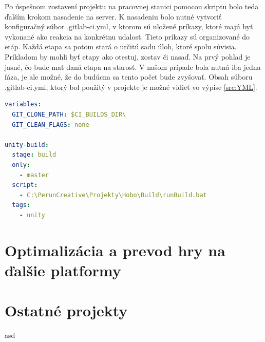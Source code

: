 \documentclass[slovak, bachelorpractice]{diploma}
\begin{document}
Po úspešnom zostavení projektu na pracovnej stanici pomocou skriptu bolo teda ďalším krokom nasadenie na server. K nasadeniu bolo nutné vytvoriť konfiguračný súbor .gitlab-ci.yml, v ktorom sú uložené príkazy, ktoré majú byť vykonané ako reakcia na konkrétnu udalosť. Tieto príkazy sú organizované do etáp. Každá etapa sa potom stará o určitú sadu úloh, ktoré spolu súvisia. Príkladom by mohli byť etapy ako otestuj, zostav či nasaď. Na prvý pohľad je jasné, čo bude mať daná etapa na starosť. V našom prípade bola nutná iba jedna fáza, je ale možné, že do budúcna sa tento počet bude zvyšovať. Obsah súboru .gitlab-ci.yml, ktorý bol použitý v projekte je možné vidieť vo výpise \ref{src:YML}.

\vspace{10pt}
\begin{lstlisting}[language=yml,label=src:YML,caption={Obsah súboru .gitlab-ci.yml}]
variables:
  GIT_CLONE_PATH: $CI_BUILDS_DIR\
  GIT_CLEAN_FLAGS: none

unity-build: 
  stage: build
  only:
    - master
  script:
    - C:\PerunCreative\Projekty\Hobo\Build\runBuild.bat
  tags: 
    - unity
\end{lstlisting}
\section{Optimalizácia a prevod hry na ďalšie platformy}
\label{sec:Port}
\section{Ostatné projekty}
\label{sec:Others}
asd



\printbibliography[title={Literatúra}, heading=bibintoc]
\end{document}
